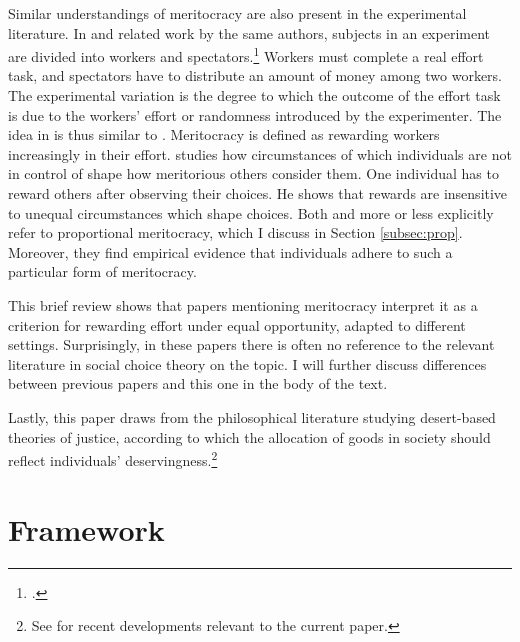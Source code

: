 Similar understandings of meritocracy are also present in the experimental literature. In \cite{cappelenMeritPrimacyEffect2023} and related work by the same authors, subjects in an experiment are divided into workers and spectators.\footnote{\cite{cappelenFairUnfairIncome2020,cappelenMeritocraticOriginEgalitarian2022,cappelenFairnessLimitedInformation2024}.} Workers must complete a real effort task, and spectators have to distribute an amount of money among two workers. The experimental variation is the degree to which the outcome of the effort task is due to the workers' effort or randomness introduced by the experimenter. The idea in \cite{cappelenMeritPrimacyEffect2023} is thus similar to \cite{morganLimitsMeritocracy2022}. Meritocracy is defined as rewarding workers increasingly in their effort. \cite{andreShallowMeritocracy2025} studies how circumstances of which individuals are not in control of shape how meritorious others consider them. One individual has to reward others after observing their choices. He shows that rewards are insensitive to unequal circumstances which shape choices. Both \cite{andreShallowMeritocracy2025} and \cite{cappelenFairnessLimitedInformation2024} more or less explicitly refer to proportional meritocracy, which I discuss in Section \ref{subsec:prop}. Moreover, they find empirical evidence that individuals adhere to such a particular form of meritocracy.

This brief review shows that papers mentioning meritocracy interpret it as a criterion for rewarding effort under equal opportunity, adapted to different settings. Surprisingly, in these papers there is often no reference to the relevant literature in social choice theory on the topic. I will further discuss differences between previous papers and this one in the body of the text.

Lastly, this paper draws from the philosophical literature studying desert-based theories of justice, according to which the allocation of goods in society should reflect individuals' deservingness.\footnote{See \cite{arnesonDesertEquality2007,kaganGeometryDesert2014,sep-meritocracy} for recent developments relevant to the current paper.}

\section{Framework}\label{sec:modelmerit}

